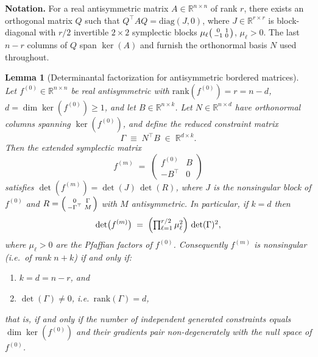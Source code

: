 \documentclass[11pt,a4paper]{article}
\newtheorem{lemma}{Lemma}
\begin{document}
\medskip
\noindent\textbf{Notation.}
For a real antisymmetric matrix $A \in \mathbb{R}^{n\times n}$ of rank $r$, there exists an orthogonal matrix $Q$ such that $Q^{\top} A Q = \mathrm{diag}(J, 0)$, where $J \in \mathbb{R}^{r\times r}$ is block-diagonal with $r/2$ invertible $2\times 2$ symplectic blocks $\mu_\ell \begin{psmallmatrix} 0 & 1 \\ -1 & 0 \end{psmallmatrix}$, $\mu_\ell > 0$. The last $n-r$ columns of $Q$ span $\ker(A)$ and furnish the orthonormal basis $N$ used throughout.

\begin{lemma}[Determinantal factorization for antisymmetric bordered matrices]\label{lem:rank}
	Let $f^{(0)} \in \mathbb{R}^{n \times n}$ be real antisymmetric with $\mathrm{rank}(f^{(0)}) = r = n - d$, $d = \dim\ker(f^{(0)}) \geq 1$, and let $B \in \mathbb{R}^{n \times k}$. Let $N \in \mathbb{R}^{n\times d}$ have orthonormal columns spanning $\ker(f^{(0)})$, and define the \emph{reduced constraint matrix}
	\[
	\Gamma \;\equiv\; N^{\top} B \;\in\; \mathbb{R}^{d\times k}.
	\]
	Then the extended symplectic matrix
	\[
	f^{(m)} \;=\; \begin{pmatrix} f^{(0)} & B \\ - B^{\top} & 0 \end{pmatrix}
	\]
	satisfies $\det(f^{(m)}) = \det(J)\,\det(R)$, where $J$ is the nonsingular block of $f^{(0)}$ and $R=\begin{psmallmatrix} 0 & \Gamma \\ -\Gamma^{\top} & M\end{psmallmatrix}$ with $M$ antisymmetric. In particular, if $k = d$ then
	\begin{equation}\label{eq:rank-lemma}
		\det\bigl(f^{(m)}\bigr) \;=\; \Bigl(\textstyle\prod_{\ell=1}^{r/2}\mu_\ell^{2}\Bigr)\,\det(\Gamma)^2 ,
	\end{equation}
	where $\mu_\ell>0$ are the Pfaffian factors of $f^{(0)}$. Consequently $f^{(m)}$ is nonsingular (i.e.\ of rank $n+k$) if and only if:
	\begin{enumerate}
		\item[\textup{(i)}] $k = d = n - r$, and
		\item[\textup{(ii)}] $\det(\Gamma) \neq 0$, i.e.\ $\mathrm{rank}(\Gamma) = d$,
	\end{enumerate}
	that is, if and only if the number of independent generated constraints equals $\dim\ker(f^{(0)})$ and their gradients pair non-degenerately with the null space of $f^{(0)}$.
\end{lemma}
\end{document}

